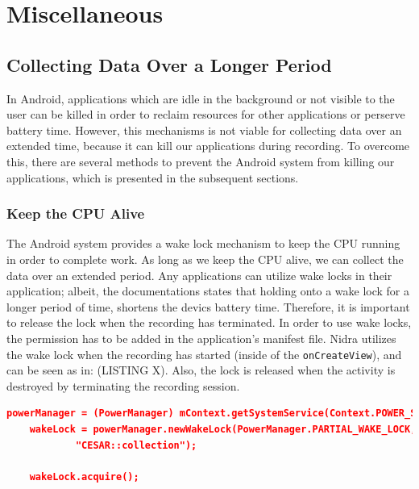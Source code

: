 

\section{Miscellaneous}

\subsection{Collecting Data Over a Longer Period}
In Android, applications which are idle in the background or not visible to the user can be killed in order to reclaim resources for other applications or perserve battery time. However, this mechanisms is not viable for collecting data over an extended time, because it can kill our applications during recording. To overcome this, there are several methods to prevent the Android system from killing our applications, which is presented in the subsequent sections.

\subsubsection{Keep the CPU Alive}
The Android system provides a wake lock mechanism to keep the CPU running in order to complete work. As long as we keep the CPU alive, we can collect the data over an extended period. Any applications can utilize wake locks in their application; albeit, the documentations states that holding onto a wake lock for a longer period of time, shortens the devics battery time. Therefore, it is important to release the lock when the recording has terminated. In order to use wake locks, the permission has to be added in the application's manifest file. Nidra utilizes the wake lock when the recording has started (inside of the \verb|onCreateView|), and can be seen as in: (LISTING X). Also, the lock is released when the activity is destroyed by terminating the recording session.

\begin{lstlisting}[language=json, caption={My Caption}, captionpos=b]
    powerManager = (PowerManager) mContext.getSystemService(Context.POWER_SERVICE);
    wakeLock = powerManager.newWakeLock(PowerManager.PARTIAL_WAKE_LOCK,
            "CESAR::collection");

    wakeLock.acquire();
\end{lstlisting}


